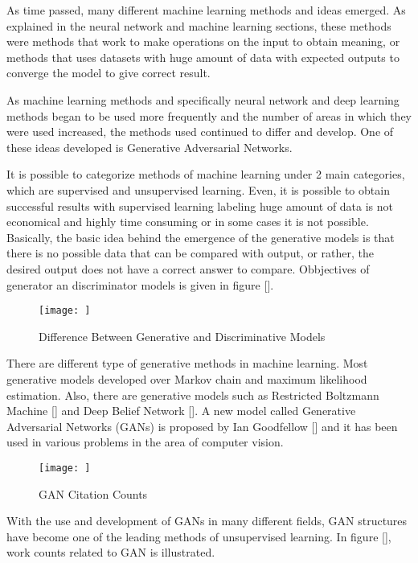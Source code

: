 As time passed, many different machine learning methods and ideas emerged. As explained in the neural network and machine learning sections, these methods were methods that work to make operations on the input to obtain meaning, or methods that uses datasets with huge amount of data with expected outputs to converge the model to give correct result.

As machine learning methods and specifically neural network and deep learning methods began to be used more frequently and the number of areas in which they were used increased, the methods used continued to differ and develop. One of these ideas developed is Generative Adversarial Networks.

It is possible to categorize methods of machine learning under 2 main categories, which are supervised and unsupervised learning. Even, it is possible to obtain successful results with supervised learning labeling huge amount of data is not economical and highly time consuming or in some cases it is not possible. Basically, the basic idea behind the emergence of the generative models is that there is no possible data that can be compared with output, or rather, the desired output does not have a correct answer to compare. Obbjectives of generator an discriminator models is given in figure [].

\begin{figure}[h]
    \centering
    \texttt{[image: ]}
    \caption{Difference Between Generative and Discriminative Models}
    \label{fig:my_label}
\end{figure}

There are different type of generative methods in machine learning. Most generative models developed over Markov chain and maximum likelihood estimation. Also, there are generative models such as Restricted Boltzmann Machine [] and Deep Belief Network [].  A new model called Generative Adversarial Networks (GANs) is proposed by Ian Goodfellow [] and it has been used in various problems in the area of computer vision.

\begin{figure}[h]
    \centering
    \texttt{[image: ]}
    \caption{GAN Citation Counts}
    \label{fig:my_label}
\end{figure}

With the use and development of GANs in many different fields, GAN structures have become one of the leading methods of unsupervised learning. In figure [], work counts related to GAN is illustrated.

